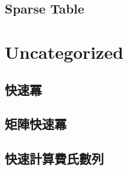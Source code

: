     \subsection{Sparse Table}
        


\section{Uncategorized}
    \subsection{快速冪}
        
    \subsection{矩陣快速冪}
        
    \subsection{快速計算費氏數列}
        